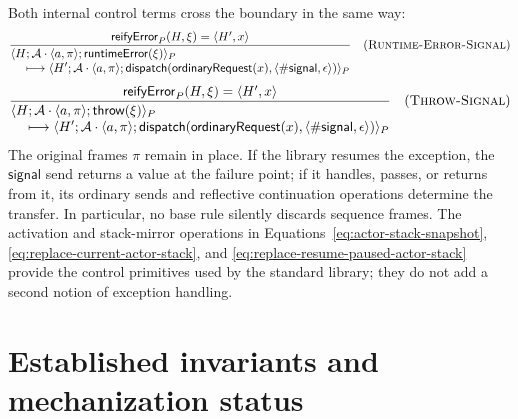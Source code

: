 \documentclass[11pt]{article}
\numberwithin{equation}{section}
\newcommand{\kw}[1]{\ensuremath{\mathsf{#1}}}
\newcommand{\rulelabel}[1]{\textsc{#1}}
\begin{document}
Both internal control terms cross the boundary in the same way:
\[
\dfrac{\mathsf{reifyError}_P(H,\xi)=\langle H',x\rangle}
 {\begin{aligned}
  &\langle H;\mathcal A\cdot\langle a,\pi\rangle;
       \kw{runtimeError}(\xi)\rangle_P\\[-1mm]
  &\quad\longmapsto
   \langle H';\mathcal A\cdot\langle a,\pi\rangle;
       \kw{dispatch}(\kw{ordinaryRequest}(x),
          \langle\#\kw{signal},\epsilon\rangle)\rangle_P
 \end{aligned}}
\quad(\rulelabel{Runtime-Error-Signal})
\]
\[
\dfrac{\mathsf{reifyError}_P(H,\xi)=\langle H',x\rangle}
 {\begin{aligned}
  &\langle H;\mathcal A\cdot\langle a,\pi\rangle;
       \kw{throw}(\xi)\rangle_P\\[-1mm]
  &\quad\longmapsto
   \langle H';\mathcal A\cdot\langle a,\pi\rangle;
       \kw{dispatch}(\kw{ordinaryRequest}(x),
          \langle\#\kw{signal},\epsilon\rangle)\rangle_P
 \end{aligned}}
\quad(\rulelabel{Throw-Signal})
\]
The original frames $\pi$ remain in place.  If the library resumes the
exception, the \kw{signal} send returns a value at the failure point; if it
handles, passes, or returns from it, its ordinary sends and reflective
continuation operations determine the transfer.  In particular, no base rule
silently discards sequence frames.  The activation and stack-mirror operations
in Equations~\eqref{eq:actor-stack-snapshot},
\eqref{eq:replace-current-actor-stack}, and
\eqref{eq:replace-resume-paused-actor-stack} provide the control primitives
used by the standard library; they do not add a second notion of exception
handling.











\section{Established invariants and mechanization status}
\end{document}
